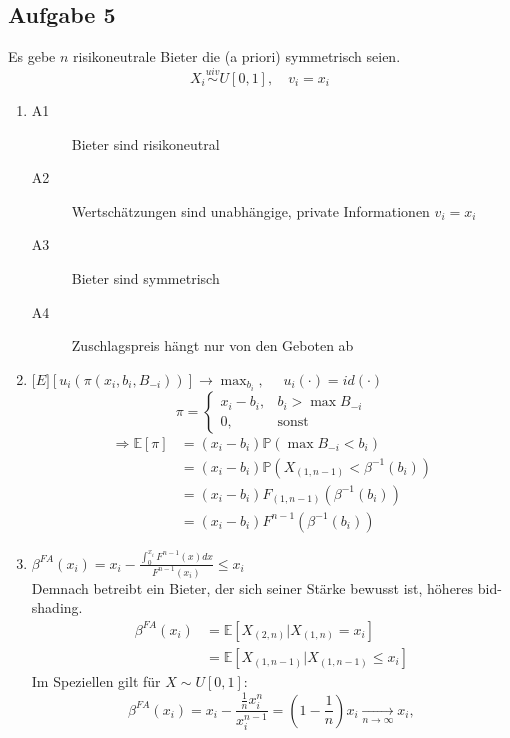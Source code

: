 \documentclass[12pt]{extreport} %
\theoremstyle{named}
\theoremstyle{nnamed}
\theoremstyle{itshape}
\theoremstyle{normal}
\begin{document}
\subsection*{Aufgabe 5}

Es gebe $n$ risikoneutrale Bieter die (a priori) symmetrisch seien.
$$ X_{i} \overset{uiv}{\sim} U[0,1], \quad v_i = x_i $$
\begin{enumerate}
	\item \begin{description}
		\item[A1] Bieter sind risikoneutral
		\item[A2] Wertschätzungen sind unabhängige, private Informationen $v_i = x_i$ 
		\item[A3] Bieter sind symmetrisch
		\item[A4] Zuschlagspreis hängt nur von den Geboten ab
	\end{description}
	\item $\mathds[E]\left[u_i\left(\pi\left(x_i, b_i, B_{-i}\right)\right)\right]  \longrightarrow \max_{b_i}, \quad$ $u_i(\cdot) = id(\cdot)$
		$$ \pi = \begin{cases} x_i - b_i, & b_i > \max B_{-i} \\ 0, & \text{sonst} \end{cases} $$
		\begin{align*}
			\Rightarrow \mathds{E}[\pi] & = (x_i - b_i) \mathds{P}\left(\max B_{-i} < b_i\right) \\
			& = (x_i - b_i) \mathds{P}\left(X_{(1,n-1)} < \beta^{-1}(b_i)\right) \\
			& = (x_i - b_i) F_{(1,n-1)}\left(\beta^{-1}(b_i) \right) \\
			& = (x_i - b_i) F^{n-1}\left(\beta^{-1}(b_i) \right)
		\end{align*}
	\item $\beta^{FA}(x_i) = x_i - \frac{\int_0^{x_{i}} F^{n-1}(x) dx}{F^{n-1}(x_i)} \leq x_i$ ~\\
		Demnach betreibt ein Bieter, der sich seiner Stärke bewusst ist, höheres bid-shading.
		\begin{align*}
			\beta^{FA}(x_i) & = \mathds{E}\left[ X_{(2,n)} \big| X_{(1,n)} = x_i \right] \\
			& = \mathds{E} \left[ X_{(1,n-1)} \big| X_{(1,n-1)} \leq x_i \right]
		\end{align*}
		Im Speziellen gilt für $X \sim U[0, 1]$:
		$$ \beta^{FA}(x_i) = x_i - \frac{\frac{1}{n} x_i^n}{x_i^{n-1}} = \left( 1 - \frac{1}{n} \right) x_i \xrightarrow[n \rightarrow \infty]{} x_i, $$

\end{enumerate}
\end{document}
